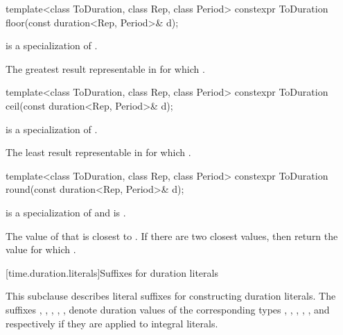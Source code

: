 %
\begin{itemdecl}
template<class ToDuration, class Rep, class Period>
  constexpr ToDuration floor(const duration<Rep, Period>& d);
\end{itemdecl}

\begin{itemdescr}
\pnum
\constraints
{} is a specialization of .

\pnum
\returns
The greatest result  representable in 
for which .
\end{itemdescr}

%
\begin{itemdecl}
template<class ToDuration, class Rep, class Period>
  constexpr ToDuration ceil(const duration<Rep, Period>& d);
\end{itemdecl}

\begin{itemdescr}
\pnum
\constraints
{} is a specialization of .

\pnum
\returns
The least result  representable in 
for which .
\end{itemdescr}

%
\begin{itemdecl}
template<class ToDuration, class Rep, class Period>
  constexpr ToDuration round(const duration<Rep, Period>& d);
\end{itemdecl}

\begin{itemdescr}
\pnum
\constraints
{} is a specialization of  and
 is .

\pnum
\returns
The value of  that is closest to .
If there are two closest values, then return the value 
for which .
\end{itemdescr}

[time.duration.literals]{Suffixes for duration literals}

\pnum
This subclause describes literal suffixes for constructing duration literals. The
suffixes , , , , , 
denote duration values of the corresponding types , ,
, , , and 
respectively if they are applied to integral literals.

